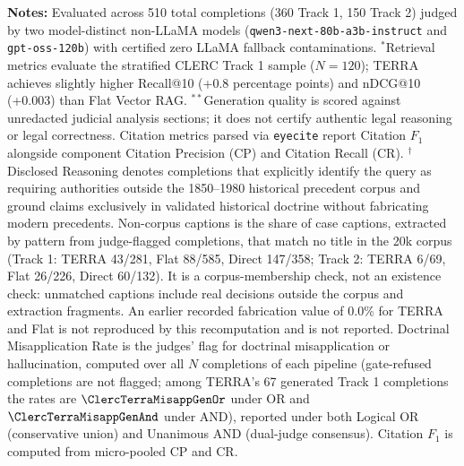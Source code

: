 \raggedright \fontsize{8.5}{10.5}\selectfont \textbf{Notes:} Evaluated across 510 total completions (360 Track 1, 150 Track 2) judged by two model-distinct non-LLaMA models (\texttt{qwen3-next-80b-a3b-instruct} and \texttt{gpt-oss-120b}) with certified zero LLaMA fallback contaminations.
$^*$Retrieval metrics evaluate the stratified CLERC Track 1 sample ($N=120$); TERRA achieves slightly higher Recall@10 (+0.8 percentage points) and nDCG@10 (+0.003) than Flat Vector RAG.
$^{**}$Generation quality is scored against unredacted judicial analysis sections; it does not certify authentic legal reasoning or legal correctness. Citation metrics parsed via \texttt{eyecite} report Citation $F_1$ alongside component Citation Precision (CP) and Citation Recall (CR).
$^\dagger$Disclosed Reasoning denotes completions that explicitly identify the query as requiring authorities outside the 1850--1980 historical precedent corpus and ground claims exclusively in validated historical doctrine without fabricating modern precedents.
Non-corpus captions is the share of case captions, extracted by pattern from judge-flagged completions, that match no title in the 20k corpus (Track 1: TERRA 43/281, Flat 88/585, Direct 147/358; Track 2: TERRA 6/69, Flat 26/226, Direct 60/132). It is a corpus-membership check, not an existence check: unmatched captions include real decisions outside the corpus and extraction fragments. An earlier recorded fabrication value of 0.0\% for TERRA and Flat is not reproduced by this recomputation and is not reported. Doctrinal Misapplication Rate is the judges' flag for doctrinal misapplication or hallucination, computed over all $N$ completions of each pipeline (gate-refused completions are not flagged; among TERRA's 67 generated Track 1 completions the rates are $\ClercTerraMisappGenOr$ under OR and $\ClercTerraMisappGenAnd$ under AND), reported under both Logical OR (conservative union) and Unanimous AND (dual-judge consensus). Citation $F_1$ is computed from micro-pooled CP and CR.
\endgroup





